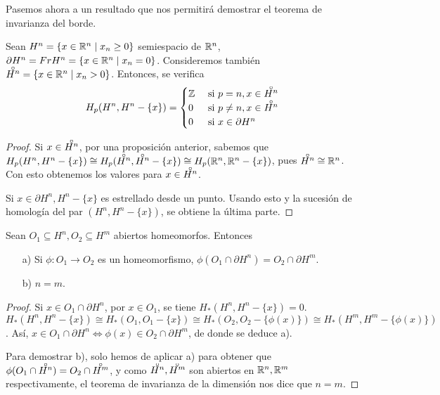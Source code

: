 Pasemos ahora a un resultado que nos permitirá demostrar el teorema de invarianza del borde.

\begin{lemma}
  Sean $H^n = \{x \in \mathbb{R}^n \mid x_n \geq 0 \}$ semiespacio de $\mathbb{R}^n$, $\partial H^n = Fr H^n = \{x \in \mathbb{R}^n \mid x_n = 0\}$.
  Consideremos también $\interior{H^n} = \{x \in \R^n \mid x_n > 0\}$. Entonces, se verifica
  \[H_p(H^n, H^n - \{x\}) =
    \begin{cases} \Z &\text{ si } p = n, x \in \interior{H^n} \\
                  0  &\text{ si } p \neq n, x \in \interior{H^n} \\
                  0  &\text{ si } x \in \partial H^n  \end{cases} \]
\end{lemma}

\begin{proof}
  Si $x \in \interior{H^n}$, por una proposición anterior, sabemos que
  $H_p(H^n, H^n - \{x\}) \cong H_p(\interior{H^n}, \interior{H^n} - \{x\}) \cong H_p(\R^n, \R^n - \{x\})$, pues
  $\interior{H^n} \cong \R^n$. Con esto obtenemos los valores para $x \in \interior{H^n}$.

  Si $x \in \partial H^n, H^n - \{x\}$ es estrellado desde un punto. Usando esto y la sucesión de homología del par $(H^n, H^n - \{x\})$,
  se obtiene la última parte.
\end{proof}

\begin{corollary}
  Sean $O_1 \subseteq H^n, O_2 \subseteq H^m$ abiertos homeomorfos. Entonces
  \begin{itemize}
    \item [a)] Si $\phi \colon O_1 \to O_2$ es un homeomorfismo, $\phi(O_1 \cap \partial H^n) = O_2 \cap \partial H^m$.
    \item [b)] $n = m$.
  \end{itemize}
\end{corollary}

\begin{proof}
  Si $x \in O_1 \cap \partial H^n$, por $x \in O_1$, se tiene $H_*(H^n, H^n - \{x\}) = 0$. \\
  $H_*(H^n, H^n - \{x\}) \cong H_*(O_1, O_1 - \{x\}) \cong H_*(O_2, O_2 - \{\phi(x)\}) \cong H_*(H^m, H^m - \{\phi(x)\})$.
  Así, $x \in O_1 \cap \partial H^n \iff \phi(x) \in O_2 \cap \partial H^m$, de donde se deduce a).

  Para demostrar b), solo hemos de aplicar a) para obtener que $\phi(O_1 \cap \interior{H^n}) = O_2 \cap \interior{H^m}$, y como
  $\interior{H^n}, \interior{H^m}$ son abiertos en $\mathbb{R}^n, \mathbb{R}^m$ respectivamente, el teorema de invarianza de la dimensión
  nos dice que $n = m$.
\end{proof}

